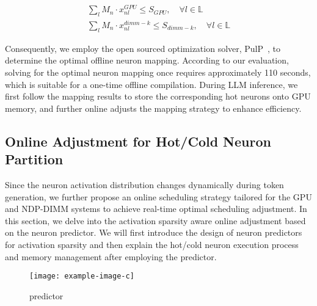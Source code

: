 \begin{align}
   \sum_{l} M_{n} \cdot x_{nl}^{GPU} \le S_{GPU}, \quad \forall l \in \mathbb{L} \label{eq6}\\ 
   \sum_{l} M_{n} \cdot x_{nl}^{dimm-k} \le S_{dimm-k}, \quad \forall l \in \mathbb{L} \label{eq7}
\end{align}

Consequently, we employ the open sourced optimization solver, PulP~\cite{pulp-solver}, to determine the optimal offline neuron mapping.
According to our evaluation, solving for the optimal neuron mapping once requires approximately 110 seconds, which is suitable for a one-time offline compilation. 
During LLM inference, we first follow the mapping results to store the corresponding hot neurons onto GPU memory, and further online adjusts the mapping strategy to enhance efficiency.



\subsection{Online Adjustment for Hot/Cold Neuron Partition}\label{sec:partition-design}
Since the neuron activation distribution changes dynamically during token generation, 
we further propose an online scheduling strategy tailored for the GPU and NDP-DIMM systems to achieve real-time optimal scheduling adjustment.
In this section, we delve into the activation sparsity aware online adjustment based on the neuron predictor. 
We will first introduce the design of neuron predictors for activation sparsity and then explain the hot/cold neuron execution process and memory management after employing the predictor.


\begin{figure}[t]
    \centering
    \texttt{[image: example-image-c]}
    \caption{predictor}
    \label{fig:predictor}
\end{figure}
